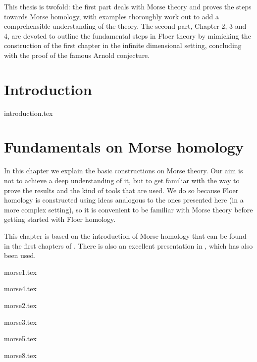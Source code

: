 \documentclass[a4paper,11pt]{book}
\begin{document}
This thesis is twofold: the first part deals with Morse theory and proves the steps towards Morse homology, with examples thoroughly work out to add a comprehensible understanding of the theory. The second part, Chapter 2, 3 and 4, are devoted to outline the fundamental steps in Floer theory by mimicking the construction of the first chapter in the infinite dimensional setting, concluding with the proof of the famous Arnold conjecture.

\tableofcontents

\mainmatter

\chapter*{Introduction}
{introduction.tex}

\chapter{Fundamentals on Morse homology}
In this chapter we explain the basic constructions on Morse theory. Our aim is not to achieve a deep understanding of it, but to get familiar with the way to prove the results and the kind of tools that are used. We do so because Floer homology is constructed using ideas analogous to the ones presented here (in a more complex setting), so it is convenient to be familiar with Morse theory before getting started with Floer homology.

This chapter is based on the introduction of Morse homology that can be found in the first chapters of \cite{audin2014morse}. There is also an excellent presentation in \cite{milnor1963morse}, which has also been used.

{morse1.tex}

 {morse4.tex}

 {morse2.tex}

 {morse3.tex}

 {morse5.tex}

{morse8.tex}
\end{document}
